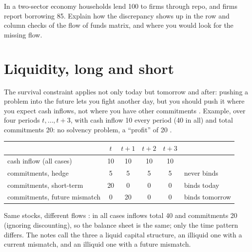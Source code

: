 \begin{paracol}{2}
\begin{exercise}
In a two-sector economy households lend 100 to firms through repo, and firms report borrowing 85. Explain how the discrepancy shows up in the
row and column checks of the flow of funds matrix, and where you would look for the missing flow.
\end{exercise}

\section{Liquidity, long and short}\label{sec:mv-longshort}

The survival constraint applies not only today but tomorrow and after: pushing a problem into the future lets you fight another day, but
you should push it where you expect cash inflows, not where you have other commitments . Example, over four
periods $t,\dots,t+3$, with cash inflow 10 every period (40 in all) and total commitments 20: no solvency problem, a ``profit'' of 20
.

\begin{nfigure}
\renewcommand{\arraystretch}{1.35}
\begin{tabular}{l|cccc|l}
 & $t$ & $t+1$ & $t+2$ & $t+3$ & \\\hline
cash inflow (all cases) & 10 & 10 & 10 & 10 & \\\hline
commitments, hedge & 5 & 5 & 5 & 5 & never binds\\
commitments, short-term & 20 & 0 & 0 & 0 & binds today\\
commitments, future mismatch & 0 & 20 & 0 & 0 & binds tomorrow\\
\end{tabular}
\caption{Same stocks, different flows : in all cases inflows total 40 and commitments 20 (ignoring
discounting), so the balance sheet is the same; only the time pattern differs. The notes call the three a liquid capital structure, an
illiquid one with a current mismatch, and an illiquid one with a future mismatch.}\label{fig:mv-patterns}
\end{nfigure}


\end{paracol}
